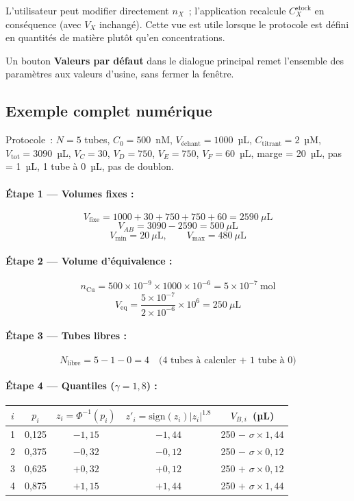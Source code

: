 \documentclass[12pt, a4paper]{article}
\begin{document}
L'utilisateur peut modifier directement $n_X$~; l'application recalcule
$C_X^\text{stock}$ en conséquence (avec $V_X$ inchangé). Cette vue est utile
lorsque le protocole est défini en quantités de matière plutôt qu'en
concentrations.

Un bouton \textbf{Valeurs par défaut} dans le dialogue principal remet
l'ensemble des paramètres aux valeurs d'usine, sans fermer la fenêtre.

\subsection{Exemple complet numérique}

Protocole~: $N = 5$ tubes, $C_0 = 500$~nM, $V_\text{échant} = 1000$~µL,
$C_\text{titrant} = 2$~µM, $V_\text{tot} = 3090$~µL, $V_C = 30$, $V_D = 750$,
$V_E = 750$, $V_F = 60$~µL, marge = 20~µL, pas = 1~µL, 1 tube à 0~µL,
pas de doublon.

\paragraph{Étape 1 — Volumes fixes :}
\[
V_\text{fixe} = 1000 + 30 + 750 + 750 + 60 = 2590~\mu\text{L}
\]
\[
V_{AB} = 3090 - 2590 = 500~\mu\text{L}
\]
\[
V_\text{min} = 20~\mu\text{L}, \qquad V_\text{max} = 480~\mu\text{L}
\]

\paragraph{Étape 2 — Volume d'équivalence :}
\[
n_\text{Cu} = 500 \times 10^{-9} \times 1000 \times 10^{-6} = 5 \times 10^{-7}~\text{mol}
\]
\[
V_\text{eq} = \frac{5 \times 10^{-7}}{2 \times 10^{-6}} \times 10^6 = 250~\mu\text{L}
\]

\paragraph{Étape 3 — Tubes libres :}
\[
N_\text{libre} = 5 - 1 - 0 = 4 \quad \text{(4 tubes à calculer + 1 tube à 0)}
\]

\paragraph{Étape 4 — Quantiles ($\gamma = 1{,}8$) :}

\begin{center}
\begin{tabular}{ccccc}
\toprule
$i$ & $p_i$ & $z_i = \Phi^{-1}(p_i)$ & $z'_i = \text{sign}(z_i)|z_i|^{1.8}$ & $V_{B,i}$~(µL) \\
\midrule
1 & 0,125 & $-1{,}15$ & $-1{,}44$ & 250 $-$ $\sigma \times 1{,}44$ \\
2 & 0,375 & $-0{,}32$ & $-0{,}12$ & 250 $-$ $\sigma \times 0{,}12$ \\
3 & 0,625 & $+0{,}32$ & $+0{,}12$ & 250 $+$ $\sigma \times 0{,}12$ \\
4 & 0,875 & $+1{,}15$ & $+1{,}44$ & 250 $+$ $\sigma \times 1{,}44$ \\
\bottomrule
\end{tabular}
\end{center}
\end{document}
